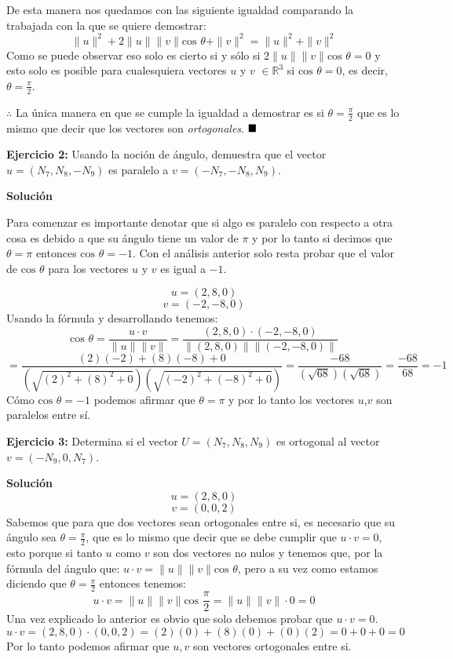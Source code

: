 \documentclass{article}
\begin{document}
De esta manera nos quedamos con las siguiente igualdad comparando la trabajada con la que se quiere demostrar:
$$\|u\|^2+2 \|u\|\|v\|\text{cos } \theta + \|v\|^2 = \|u\|^2+\|v\|^2$$
Como se puede observar eso solo es cierto si y sólo si $2 \|u\|\|v\|\text{cos } \theta = 0$ y esto solo es posible para
cualesquiera vectores $u$ y $v$ $\in \mathbb{R}^3$ si $\text{cos } \theta = 0$, es decir, $\theta = \frac{\pi}{2}$.\par
$\therefore$ La única manera en que se cumple la igualdad a demostrar es si $\theta = \frac{\pi}{2}$ que es lo mismo que
decir que los vectores son \emph{ortogonales}.
$\hfill\blacksquare$
\vspace{10pt}


\textbf{Ejercicio 2:} Usando la noción de ángulo, demuestra que el vector $u = (N_7, N_8, -N_9)$ es paralelo a
$v= (-N_7, -N_8, N_9)$. \par
\textbf{Solución}
\vspace*{10pt}


Para comenzar es importante denotar que si algo es paralelo con respecto a otra cosa es debido a que su ángulo tiene un
valor de $\pi$ y por lo tanto si decimos que $\theta = \pi$ entonces $\text{cos } \theta =  -1$. Con el análisis anterior solo resta
probar que el valor de $\text{cos } \theta$ para los vectores $u$ y $v$ es igual a $-1$. \par
   $$ u = (2, 8 , 0)$$
   $$v = (-2, -8, 0)$$
Usando la fórmula y desarrollando tenemos:
$$\text{cos }\theta = \frac{u\cdot v}{\|u\|\|v\|} = \frac{(2, 8 , 0) \cdot (-2, -8, 0)}{\|(2, 8 , 0)\|\|(-2, -8, 0)\|}$$
$$= \frac{(2)(-2)+ (8)(-8)+ 0}{(\sqrt{(2)^2+ (8)^2+ 0})(\sqrt{(-2)^2+(-8)^2+0})} = \frac{-68}{(\sqrt{68})(\sqrt{68})} = \frac{-68}{68} = -1$$
Cómo $\text{cos }\theta=-1$  podemos afirmar que $\theta = \pi$ y por lo tanto los vectores $u$,$v$ son paralelos entre sí. \par


\textbf{Ejercicio 3:} Determina si el vector $U = (N_7, N_8, N_9)$ es ortogonal al vector $v = (-N_9, 0, N_7)$.
\vspace{10pt}


\textbf{Solución}
   $$u = (2, 8, 0)$$
   $$v = (0, 0, 2)$$
Sabemos que para que dos vectores sean ortogonales entre si, es necesario que su ángulo sea $\theta = \frac{\pi}{2}$, que es lo mismo que
decir que se debe cumplir que $u\cdot v = 0 $, esto porque si tanto $u$ como $v$ son dos vectores no nulos y tenemos que, por la fórmula del
ángulo que: $u\cdot v = \|u\|\|v\|\text{cos } \theta$, pero a su vez como estamos diciendo que $\theta = \frac{\pi}{2}$ entonces tenemos:
$$u\cdot v = \|u\|\|v\|\text{cos } \frac{\pi}{2} =  \|u\|\|v\| \cdot 0  =  0$$
Una vez explicado lo anterior es obvio que solo debemos probar que $u \cdot v = 0$.
$$u \cdot v   = (2, 8, 0) \cdot (0, 0, 2) = (2)(0)+ (8)(0)+ (0)(2) = 0+0+0 = 0$$
Por lo tanto podemos afirmar que $u,v$ son vectores ortogonales entre si.\par
\vspace{10pt}
\end{document}
